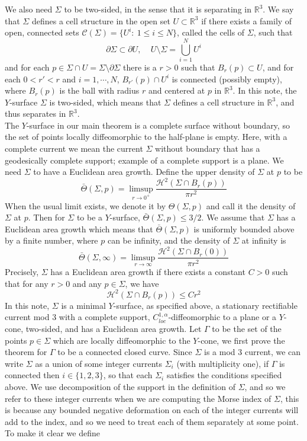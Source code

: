 \documentclass[11pt]{amsart}
\numberwithin{equation}{section}
\theoremstyle{theorem}
\theoremstyle{definition}
\numberwithin{equation}{section}
\begin{document}
We also need $\Sigma$ to be two-sided, in the sense that it is separating in $\mathbb{R}^3$. We say that $\Sigma$ defines a cell structure in the open set $U\subset \mathbb{R}^3$ if there exists a family of open, connected sets $\mathcal{C}(\Sigma)=\{ U^i:\ 1\leq i\leq N\}$, called the cells of $\Sigma$, such that
$$
\partial \Sigma \subset \partial U,\ \ \ \ \ U\setminus \Sigma =\bigcup_{i=1}^N
U^i$$
and for each $p\in \Sigma \cap U=\Sigma \setminus \partial \Sigma$ there is a $r>0$ such that $B_r(p)\subset U$, and for each $0<r'<r$ and $i=1,\cdots,N$, $B_{r'}(p)\cap U^i$ is connected (possibly empty), where $B_r(p)$ is the ball with radius $r$ and centered at $p$ in $\mathbb{R}^3$. In this note, the $Y$-surface $\Sigma$ is two-sided, which means that $\Sigma$ defines a cell structure in $\mathbb{R}^3$, and thus separates in $\mathbb{R}^3$.\\ 
The $Y$-surface in our main theorem is a complete surface without boundary, so the set of points locally diffeomorphic to the half-plane is empty. Here, with a complete current we mean the current $\Sigma$ without boundary that has a geodesically complete support; example of a complete support is a plane. We need $\Sigma$ to have a Euclidean area growth. Define the upper density of $\Sigma$ at $p$ to be 
$$
\bar{\Theta}(\Sigma ,p)=\limsup_{r\to 0^+} \frac{\mathcal{H}^2(\Sigma \cap B_r(p))}{\pi r^2}
$$
When the usual limit exists, we denote it by $\Theta(\Sigma ,p)$ and call it the density of $\Sigma$ at $p$. Then for $\Sigma$ to be a $Y$-surface, $\bar{\Theta}(\Sigma,p)\leq 3/2$. We assume that $\Sigma$ has a Euclidean area growth which means that $\bar{\Theta}(\Sigma ,p)$ is uniformly bounded above by a finite number, where $p$ can be infinity, and the density of $\Sigma$ at infinity is
$$
\bar{\Theta}(\Sigma ,\infty)=\limsup_{r\to \infty} \frac{\mathcal{H}^2(\Sigma \cap B_r(0))}{\pi r^2}
$$
Precisely, $\Sigma$ has a Euclidean area growth if there exists a constant $C>0$ such that for any $r>0$ and any $p\in \Sigma$, we have
$$
\mathcal{H}^2(\Sigma \cap B_r(p)) \leq Cr^2
$$
In this note, $\Sigma$ is a minimal $Y$-surface, as specified above, a stationary rectifiable current mod $3$ with a complete support, $C_{loc}^{1,\alpha}$-diffeomorphic to a plane or a $Y$-cone, two-sided, and has a Euclidean area growth. Let $\Gamma$ to be the set of the points $p\in \Sigma$ which are locally diffeomorphic to the $Y$-cone, we first prove the theorem for $\Gamma$ to be a connected closed curve. Since $\Sigma$ is a mod 3 current, we can write $\Sigma$ as a union of some integer currents $\Sigma_i$ (with multiplicity one), if $\Gamma$ is connected then $i\in \{1,2,3\}$, so that each $\Sigma_i$ satisfies the conditions specified above. We use decomposition of the support in the definition of $\Sigma$, and so we refer to these integer currents when we are computing the Morse index of $\Sigma$, this is because any bounded negative deformation on each of the integer currents will add to the index, and so we need to treat each of them separately at some point. To make it clear we define
\end{document}
